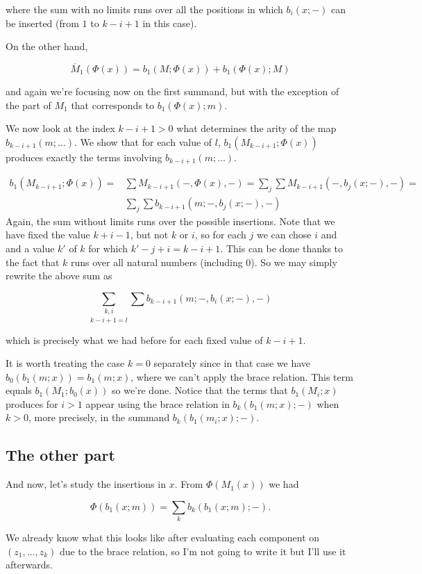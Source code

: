 \documentclass[twoside]{article}
\begin{document}
where the sum with no limits runs over all the positions in which $b_i(x;-)$ can be inserted (from $1$ to $k-i+1$ in this case).

On the other hand, 

$$\overline{M}_1(\Phi(x))=b_1(M;\Phi(x))+b_1(\Phi(x);M)$$

and again we're focusing now on the first summand, but with the exception of the part of $M_1$ that corresponds to $b_1(\Phi(x);m)$. 

We now look at the index $k-i+1> 0$ what determines the arity of the map $b_{k-i+1}(m;\dots)$. We show that for each value of $l$, $b_1(M_{k-i+1};\Phi(x))$ produces exactly the terms involving $b_{k-i+1}(m;\dots)$. 

\begin{align*}
b_1(M_{k-i+1};\Phi(x))=&\sum M_{k-i+1}(-,\Phi(x),-)=\sum_j\sum M_{k-i+1}(-,b_j(x;-),-)=\\
&\sum_j\sum b_{k-i+1}(m;-,b_j(x;-),-)
\end{align*}
Again, the sum without limits runs over the possible insertions. Note that we have fixed the value $k+i-1$, but not $k$ or $i$, so for each $j$ we can chose $i$ and and a value $k'$ of $k$ for which $k'-j+i=k-i+1$. This can be done thanks to the fact that $k$ runs over all natural numbers (including 0). So we may simply rewrite the above sum as

$$\underset{k-i+1=l}{\sum_{k,i}}\sum b_{k-i+1}(m;-,b_i(x;-),-)$$

which is precisely what we had before for each fixed value of $k-i+1$. %

It is worth treating the case $k=0$ separately since in that case we have $b_0(b_1(m;x))=b_1(m;x)$, where we can't apply the brace relation. This term equals $b_1(M_1;b_0(x))$ so we're done. Notice that the terms that $b_1(M_i;x)$ produces for $i>1$ appear using the brace relation in $b_k(b_1(m;x);-)$ when $k>0$, more precisely, in the summand $b_k(b_1(m_i;x);-)$. 

\subsection{The other part}

And now, let's study the insertions in $x$. From $\Phi(M_1(x))$ we had 

$$\Phi(b_1(x;m))=\sum_k b_k(b_1(x;m);-).$$

We already know what this looks like after evaluating each component on $(z_1,\dots, z_k)$ due to the brace relation, so I'm not going to write it but I'll use it afterwards. 
\end{document}
